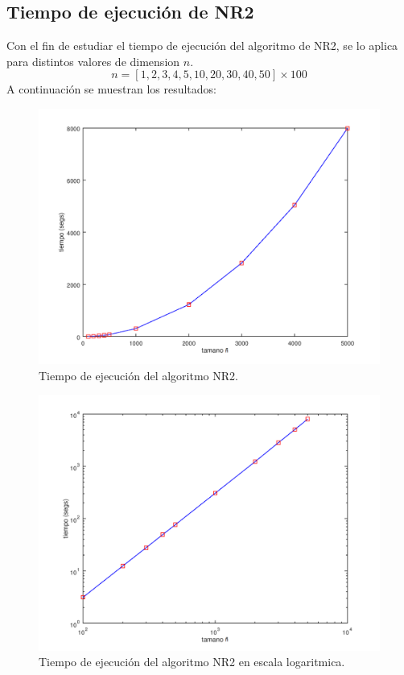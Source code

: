 \documentclass{endm}
\begin{document}
\subsection{Tiempo de ejecución de NR2}
Con el fin de estudiar el tiempo de ejecución del algoritmo de NR2, se lo aplica para distintos valores de dimension $n$.
\begin{equation*}
    n = [1, 2, 3, 4, 5, 10, 20, 30, 40, 50] \times 100
\end{equation*}
A continuación se muestran los resultados:
\begin{figure}[h!]
    \includegraphics[width=\linewidth]{Grafica_5_3_1.png}
    \caption{Tiempo de ejecución del algoritmo NR2.}
    \label{fig:Grafica_5_3_1}
\end{figure}
\begin{figure}[h!]
    \includegraphics[width=\linewidth]{Grafica_5_3_2.png}
    \caption{Tiempo de ejecución del algoritmo NR2 en escala logaritmica.}
    \label{fig:Grafica_5_3_2}
\end{figure}
\end{document}
